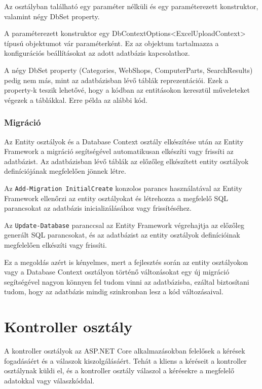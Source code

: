 \documentclass[
]{thesis-ekf}
\theoremstyle{definition}
\theoremstyle{remark}
\begin{document}

Az osztályban található egy paraméter nélküli és egy paraméterezett konstruktor, valamint négy DbSet property. 

A paraméterezett konstruktor egy DbContextOptions<ExcelUploadContext> típusú objektumot vár paraméterként. Ez az objektum tartalmazza a konfigurációs beállításokat az adott adatbázis kapcsolathoz.

A négy DbSet property (Categories, WebShops, ComputerParts, SearchResults) pedig nem más, mint az adatbázisban lévő táblák reprezentációi. Ezek a property-k teszik lehetővé, hogy a kódban az entitásokon keresztül műveleteket végezek a táblákkal. Erre példa az alábbi kód.



\subsubsection{Migráció}
Az Entity osztályok és a Database Context osztály elkészítése után az Entity Framework a migráció segítségével automatikusan elkészíti vagy frissíti az adatbázist. Az adatbázisban lévő táblák az előzőleg elkészített entity osztályok definíciójának megfelelően jönnek létre.

Az \texttt{Add-Migration InitialCreate} konzolos parancs használatával az Entity Framework ellenőrzi az entity osztályokat és létrehozza a megfelelő SQL parancsokat az adatbázis inicializálásához vagy frissítéséhez.

Az \texttt{Update-Database} paranccsal az Entity Framework végrehajtja az előzőleg generált SQL parancsokat, és az adatbázist az entity osztályok definícióinak megfelelően elkészíti vagy frissíti.

Ez a megoldás azért is kényelmes, mert a fejlesztés során az entity osztályokon vagy a Database Context osztályon történő változásokat egy új migráció segítségével nagyon könnyen fel tudom vinni az adatbázisba, ezáltal biztosítani tudom, hogy az adatbázis mindig szinkronban lesz a kód változásaival.	
\section{Kontroller osztály}
A kontroller osztályok az ASP.NET Core alkalmazásokban felelősek a kérések fogadásáért és a válaszok kiszolgálásáért. Tehát a kliens a kéréseit a kontroller osztálynak küldi el, és a kontroller osztály válaszol a kérésekre a megfelelő adatokkal vagy válaszkóddal.
\end{document}
